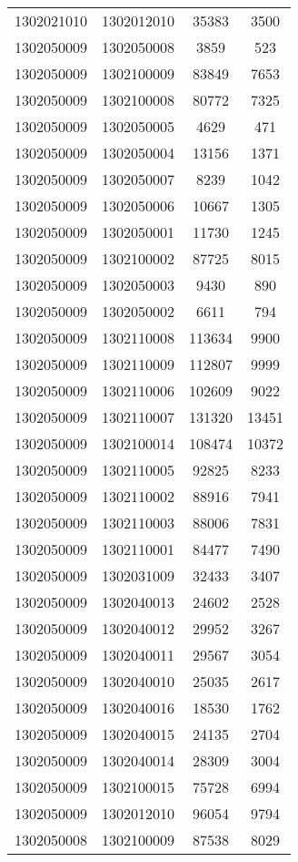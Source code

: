 \begin{longtable}[h]{llcc}
		1302021010 & 1302012010 & 35383 & 3500\\
		1302050009 & 1302050008 & 3859 & 523\\
		1302050009 & 1302100009 & 83849 & 7653\\
		1302050009 & 1302100008 & 80772 & 7325\\
		1302050009 & 1302050005 & 4629 & 471\\
		1302050009 & 1302050004 & 13156 & 1371\\
		1302050009 & 1302050007 & 8239 & 1042\\
		1302050009 & 1302050006 & 10667 & 1305\\
		1302050009 & 1302050001 & 11730 & 1245\\
		1302050009 & 1302100002 & 87725 & 8015\\
		1302050009 & 1302050003 & 9430 & 890\\
		1302050009 & 1302050002 & 6611 & 794\\
		1302050009 & 1302110008 & 113634 & 9900\\
		1302050009 & 1302110009 & 112807 & 9999\\
		1302050009 & 1302110006 & 102609 & 9022\\
		1302050009 & 1302110007 & 131320 & 13451\\
		1302050009 & 1302100014 & 108474 & 10372\\
		1302050009 & 1302110005 & 92825 & 8233\\
		1302050009 & 1302110002 & 88916 & 7941\\
		1302050009 & 1302110003 & 88006 & 7831\\
		1302050009 & 1302110001 & 84477 & 7490\\
		1302050009 & 1302031009 & 32433 & 3407\\
		1302050009 & 1302040013 & 24602 & 2528\\
		1302050009 & 1302040012 & 29952 & 3267\\
		1302050009 & 1302040011 & 29567 & 3054\\
		1302050009 & 1302040010 & 25035 & 2617\\
		1302050009 & 1302040016 & 18530 & 1762\\
		1302050009 & 1302040015 & 24135 & 2704\\
		1302050009 & 1302040014 & 28309 & 3004\\
		1302050009 & 1302100015 & 75728 & 6994\\
		1302050009 & 1302012010 & 96054 & 9794\\
		1302050008 & 1302100009 & 87538 & 8029\\

\end{longtable}
